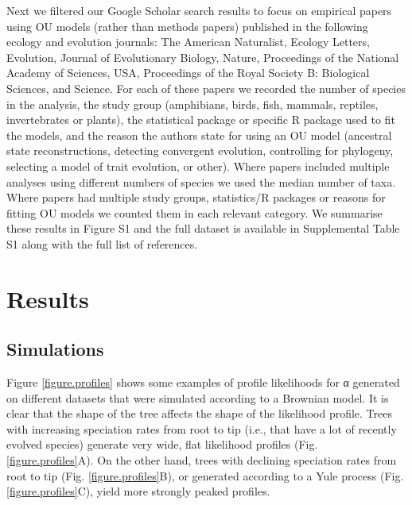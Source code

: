 \documentclass[a4paper,12pt]{article}
\begin{document}
Next we filtered our Google Scholar search results to focus on empirical papers using OU models (rather than methods papers) published in the following ecology and evolution journals: The American Naturalist, Ecology Letters, Evolution, Journal of Evolutionary Biology, Nature, Proceedings of the National Academy of Sciences, USA, Proceedings of the Royal Society B: Biological Sciences, and Science. For each of these papers we recorded the number of species in the analysis, the study group (amphibians, birds, fish, mammals, reptiles, invertebrates or plants), the statistical package or specific R package used to fit the models, and the reason the authors state for using an OU model (ancestral state reconstructions, detecting convergent evolution, controlling for phylogeny, selecting a model of trait evolution, or other). Where papers included multiple analyses using different numbers of species we used the median number of taxa. Where papers had multiple study groups, statistics/R packages or reasons for fitting OU models we counted them in each relevant category. We summarise these results in Figure S1 and the full dataset is available in Supplemental Table S1 along with the full list of references.

\section{Results}
\subsection{Simulations}
\label{section:sims.results} 
Figure \ref{figure.profiles} shows some examples of profile likelihoods for α generated on different datasets that were simulated according to a Brownian model. It is clear that the shape of the tree affects the shape of the likelihood profile. Trees with increasing speciation rates from root to tip (i.e., that have a lot of recently evolved species) generate very wide, flat likelihood profiles (Fig. \ref{figure.profiles}A). On the other hand, trees with declining speciation rates from root to tip (Fig. \ref{figure.profiles}B), or generated according to a Yule process (Fig. \ref{figure.profiles}C), yield more strongly peaked profiles. 
\end{document}
